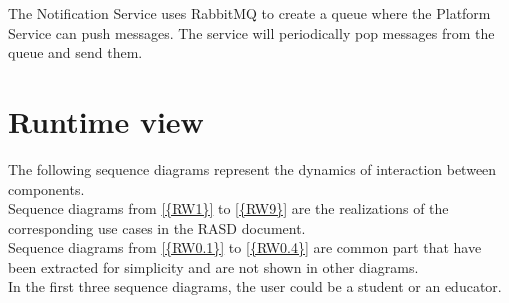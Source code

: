 The Notification Service uses RabbitMQ to create a queue where the Platform Service can push messages.
The service will periodically pop messages from the queue and send them.

\pagebreak

\section{Runtime view}
The following sequence diagrams represent the dynamics of interaction between components.\\
Sequence diagrams from \ref{{RW1}} to \ref{{RW9}} are the realizations of the corresponding use cases in the RASD document.\\
Sequence diagrams from \ref{{RW0.1}} to \ref{{RW0.4}} are common part that have been extracted for simplicity and are not shown in other diagrams.\\
In the first three sequence diagrams, the user could be a student or an educator.

